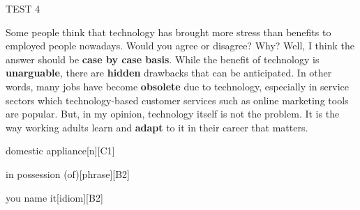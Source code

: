 \begin{glossarymc}[Cambridge 7]
\begin{test}{TEST 4}
    \begin{qa}{Some people think that technology has brought more stress than benefits to employed people nowadays. Would you agree or disagree? Why?}
    Well, I think the answer should be \textbf{case by case basis}. While the benefit of technology is \textbf{unarguable}, there are \textbf{hidden} drawbacks that can be anticipated. In other words, many jobs have become \textbf{obsolete} due to technology, especially in service sectors which technology-based customer services such as online marketing tools are popular. But, in my opinion, technology itself is not the problem. It is the way working adults learn and \textbf{adapt} to it in their career that matters.
    \end{qa}

        \begin{VocabExplain}[Part 3]
            \begin{ExplainCard}{domestic appliance}[n][C1]
            \end{ExplainCard}

            \begin{ExplainCard}{in possession (of)}[phrase][B2]
            \end{ExplainCard}

            \begin{ExplainCard}{you name it}[idiom][B2]
            \end{ExplainCard}


\end{VocabExplain}
\end{test}
\end{glossarymc}
